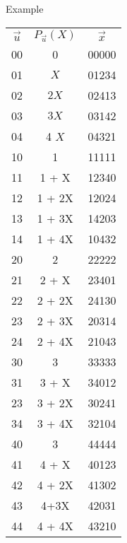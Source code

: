 \begin{parag}{Example}
    \begin{center} \begin{tabular}{ccc}$\vec{u}$ & $P_{\vec{u}}\left(X\right)$ & $\vec{x}$ \\ 00 & 0 & 00000 \\ 01 & $X$ & 01234 \\ 02 & $2X$ & 02413 \\ 03 & $3X$ & 03142 \\ 04 & 4 $X$ & 04321 \\ 10 & 1 & 11111 \\ 11 & 1 + X & 12340 \\ 12 & 1 + 2X & 12024 \\ 13 & 1 + 3X & 14203 \\ 14 & 1 + 4X & 10432 \\ 20 & 2 & 22222 \\ 21 & 2 + X & 23401 \\ 22 & 2 + 2X & 24130 \\ 23 & 2 + 3X & 20314 \\ 24 & 2 + 4X & 21043 \\ 30 & 3 & 33333 \\ 31 & 3 + X & 34012 \\ 23 & 3 + 2X & 30241 \\ 34 & 3 + 4X & 32104 \\ 40 & 3 & 44444 \\ 41 & 4 + X & 40123 \\ 42 &4 + 2X  &41302  \\43  &4+3X  & 42031 \\44  & 4 + 4X &43210  \end{tabular} \end{center} 
\end{parag}
